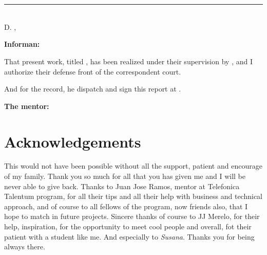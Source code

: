 \chapter*{}
\thispagestyle{empty}

\noindent\rule[-1ex]{\textwidth}{2pt}\\[4.5ex]

D. \textbf{\myMentor}, \myMentorStatus

\vspace{0.5cm}

\textbf{Informan:}

\vspace{0.5cm}

That present work, titled \textit{\textbf{\myTitle}},
has been realized under their supervision by \textbf{\myName}, and I authorize their defense front of the correspondent court.

\vspace{0.5cm}

And for the record, he dispatch and sign this report at \myDate.

\vspace{1cm}

\textbf{The mentor:}

\vspace{5cm}

\noindent \textbf{\myMentor}

\chapter*{Acknowledgements}
\thispagestyle{empty}

       \vspace{1cm}


This would not have been possible without all the support, patient and
encourage of my family. Thank you so much for all that you has given me and
I will be never able to give back.
\intro
Thanks to Juan Jose Ramos, mentor at Telefonica Talentum program, for all their
tips and all their help with business and technical approach, and of course to
all fellows of the program, now friends also, that I hope to match in future projects.
\intro
Sincere thanks of course to JJ Merelo, for their help, inspiration, for
the opportunity to meet cool people and overall, fot their patient with a student
like me.
\intro
And especially to \textit{Susana}. Thanks you for being always there.
